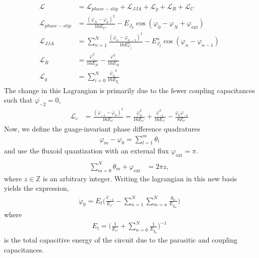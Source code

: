 \documentclass[%
reprint,
superscriptaddress,
 amsmath,amssymb,
 aps,
 prx,
longbibliography,
floatfix,
]{revtex4-2}
\begin{document}
\begin{align}
    \mathcal{L}&=\mathcal{L}_{phase-slip}+\mathcal{L}_{JJA}+\mathcal{L}_{g}+\mathcal{L}_{R}+\mathcal{L}_{C}\\
    \mathcal{L}_{phase-slip}&=\frac{(\dot{\varphi}_N-\dot{\varphi}_0)^2}{16E_{C'}}-E_{J_p}\cos(\varphi_0-\varphi_{N}+\varphi_\mathrm{ext})\\
    \mathcal{L}_{JJA}&=\sum_{n=1}^N\frac{(\dot{\varphi}_n-\dot{\varphi}_{n-1})^2}{16E^{n}_{C_j}}-E^{n}_{J_j}\cos(\varphi_n-\varphi_{n-1})\\
    \mathcal{L}_{R}&=\frac{\dot{\varphi}_{-}^2}{16E_{{R}}}-\frac{\varphi_{-}^2}{16E_{R}}\\
    \mathcal{L}_{g}&=\sum_{i=0}^{N} \frac{\dot{\varphi_n}^2}{16E_{g_i}}\label{eq:float-float}
  \end{align}
The change in this Lagrangian is primarily due to the fewer coupling capacitances such that $\dot{\varphi_{-2}}=0$,
\begin{align}
\mathcal{L}_{c}&=\frac{(\dot{\varphi}_{-1}-\dot{\varphi_0})^2}{16E_{c'}}=\frac{\dot{\varphi}^2_0}{16E_{c'}}+\frac{\dot{\varphi}^2_{-1}}{16E_{c'}}-\frac{\dot{\varphi}_0\dot{\varphi}_{-1}}{8E_{c'}}
\end{align}
Now, we define the guage-invariant phase difference quadratures 
\begin{align}
\varphi_m-\varphi_0=\sum_{l=1}^m\theta_l
\end{align}
and use the fluxoid quantization with an external flux $\varphi_{\mathrm{ext}}=\pi$.
\begin{align}
\\ \sum_{m=0}^N \theta_m+\varphi_\mathrm{ext}&=2\pi z,
\end{align}
where $z\in\mathbb{Z}$ is an arbitrary integer. Writing the lagrangian in this new basis yields the expression,
\begin{align}
    \dot{\varphi}_0=E_t\Big(\frac{\dot{\varphi}_{-1}}{E_{c'}}-\sum_{n=1}^N\sum_{m=n}^N\frac{\dot{\theta}_n}{E_{g_m}}\Big)
\end{align}
where 
\begin{align}
E_t=\Big(\frac{1}{E_{c'}}+\sum_{n=0}^N\frac{1}{E_{g_n}}\Big)^{-1}
\end{align}
is the total capacitive energy of the circuit due to the parasitic and coupling capacitances.
\end{document}
